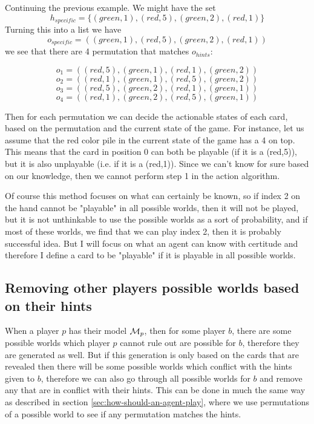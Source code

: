 Continuing the previous example. We might have the set \[h_{specific} = \{(green,1),(red,5),(green,2),(red,1)\}\]
Turning this into a list we have
\[o_{specific} = ((green,1),(red,5),(green,2),(red,1))\]
we see that there are 4 permutation that matches $o_{hints}$:

\[o_{1} = ((red,5),(green,1),(red,1),(green,2))\]
\[o_{2} = ((red,1),(green,1),(red,5),(green,2))\]
\[o_{3} = ((red,5),(green,2),(red,1),(green,1))\]
\[o_{4} = ((red,1),(green,2),(red,5),(green,1))\]

Then for each permutation we can decide the actionable states of each card, based on the permutation and the current state of the game. For instance, let us assume that the red color pile in the current state of the game has a 4 on top. This means that the card in position 0 can both be playable (if it is a (red,5)), but it is also unplayable (i.e. if it is a (red,1)). Since we can't know for sure based on our knowledge, then we cannot perform step 1 in the action algorithm.

Of course this method focuses on what can certainly be known, so if index 2 on the hand cannot be "playable" in all possible worlds, then it will not be played, but it is not unthinkable to use the possible worlds as a sort of probability, and if most of these worlds, we find that we can play index 2, then it is probably successful idea. But I will focus on what an agent can know with certitude and therefore I define a card to be "playable" if it is playable in all possible worlds.

\subsection{Removing other players possible worlds based on their hints} \label{sec:design:removing-worlds-based-on-hints}
When a player $p$ has their model $\mathcal{M}_p$, then for some player $b$, there are some possible worlds which player $p$ cannot rule out are possible for $b$, therefore they are generated as well. But if this generation is only based on the cards that are revealed then there will be some possible worlds which conflict with the hints given to $b$, therefore we can also go through all possible worlds for $b$ and remove any that are in conflict with their hints. This can be done in much the same way as described in section \ref{sec:how-should-an-agent-play}, where we use permutations of a possible world to see if any permutation matches the hints.


